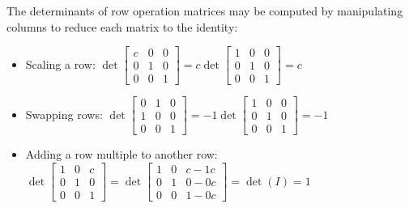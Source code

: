 \begin{applicationActivities}
\begin{fact}
The determinants of row operation matrices may be computed
by manipulating columns to reduce each matrix to the identity:
\begin{itemize}
\item Scaling a row: \(\det
  \begin{bmatrix}
  c & 0 & 0 \\
  0 & 1 & 0 \\
  0 & 0 & 1
  \end{bmatrix}
    =
  c\det
  \begin{bmatrix}
  1 & 0 & 0 \\
  0 & 1 & 0 \\
  0 & 0 & 1
  \end{bmatrix}
    =
  c
\)
\item Swapping rows: \(\det
  \begin{bmatrix}
  0 & 1 & 0 \\
  1 & 0 & 0 \\
  0 & 0 & 1
  \end{bmatrix}
    =
  -1\det
  \begin{bmatrix}
  1 & 0 & 0 \\
  0 & 1 & 0 \\
  0 & 0 & 1
  \end{bmatrix}
    =
  -1
\)
\item Adding a row multiple to another row: \(\det
  \begin{bmatrix}
  1 & 0 & c \\
  0 & 1 & 0 \\
  0 & 0 & 1
  \end{bmatrix}
    =
  \det
  \begin{bmatrix}
  1 & 0 & c-1c \\
  0 & 1 & 0-0c \\
  0 & 0 & 1-0c
  \end{bmatrix}
    =
  \det(I)=1
\)
\end{itemize}
\end{fact}


\end{applicationActivities}
